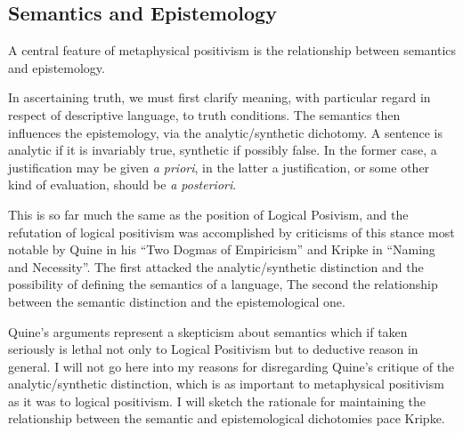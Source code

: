 \subsection{Semantics and Epistemology}

A central feature of metaphysical positivism is the relationship between semantics and epistemology.

In ascertaining truth, we must first clarify meaning, with particular regard in respect of descriptive language, to truth conditions.
The semantics then influences the epistemology, via the analytic/synthetic dichotomy.
A sentence is analytic if it is invariably true, synthetic if possibly false.
In the former case, a justification may be given \emph{a priori}, in the latter a justification, or some other kind of evaluation, should be \emph{a posteriori}.

This is so far much the same as the position of Logical Posivism, and the refutation of logical positivism was accomplished by criticisms of this stance most notable by Quine in his ``Two Dogmas of Empiricism''\cite{quine53} and Kripke in ``Naming and Necessity''.
The first attacked the analytic/synthetic distinction and the possibility of defining the semantics of a language,
The second the relationship between the semantic distinction and the epistemological one.

Quine's arguments represent a skepticism about semantics which if taken seriously is lethal not only to Logical Positivism but to deductive reason in general.
I will not go here into my reasons for disregarding Quine's critique of the analytic/synthetic distinction, which is as important to metaphysical positivism as it was to logical positivism.
I will sketch the rationale for maintaining the relationship between the semantic and epistemological dichotomies pace Kripke.





